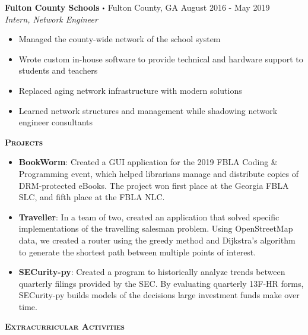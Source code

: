 \documentclass{article}
\newcommand\sbullet[1][.5]{\mathbin{\vcenter{\hbox{\scalebox{#1}{$\bullet$}}}}}
\begin{document}
  \vspace{5pt}

  \textbf{Fulton County Schools} $\sbullet$ Fulton County, GA \hspace*{\fill} August 2016 - May 2019\\
  \textit{Intern, Network Engineer}
  \begin{itemize}
    \item Managed the county-wide network of the school system
    \item Wrote custom in-house software to provide technical and hardware support to students and teachers
    \item Replaced aging network infrastructure with modern solutions
    \item Learned network structures and management while shadowing network engineer consultants
  \end{itemize}

  \vspace{10pt}

  {\large \textbf{\textsc{Projects}}}\hspace{5pt}\xrfill[.5ex]{.4pt}

  \vspace{3pt}

  \begin{itemize}
    \item \textbf{BookWorm}: Created a GUI application for the 2019 FBLA Coding \& Programming event, which helped librarians manage and distribute copies of DRM-protected eBooks. The project won first place at the Georgia FBLA SLC, and fifth place at the FBLA NLC.
    \item \textbf{Traveller}: In a team of two, created an application that solved specific implementations of the travelling salesman problem. Using OpenStreetMap data, we created a router using the greedy method and Dijkstra's algorithm to generate the shortest path between multiple points of interest.
    \item \textbf{SECurity-py}: Created a program to historically analyze trends between quarterly filings provided by the SEC. By evaluating quarterly 13F-HR forms, SECurity-py builds models of the decisions large investment funds make over time.
  \end{itemize}

  \vspace{10pt}

  {\large \textbf{\textsc{Extracurricular Activities}}}\hspace{5pt}\xrfill[.5ex]{.4pt}
  
\end{document}
